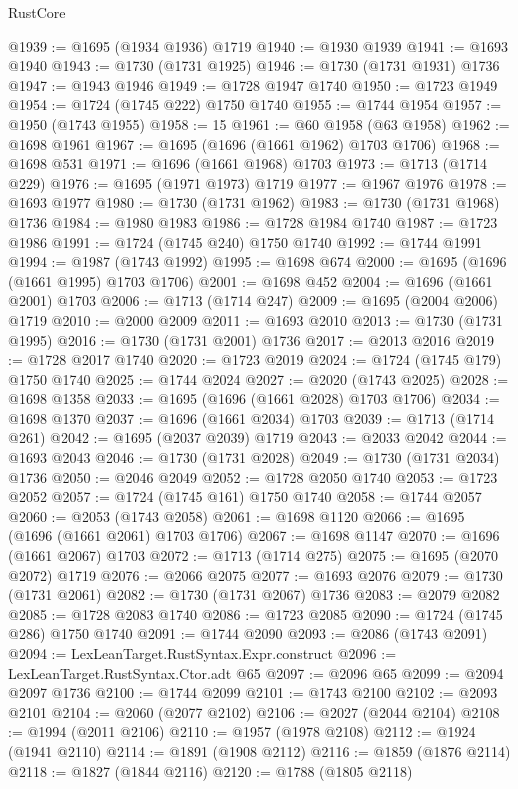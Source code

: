 \begin{lexlean}{RustCore}
\begin{coremodule}
@1939 := @1695 (@1934 @1936) @1719
@1940 := @1930 @1939
@1941 := @1693 @1940
@1943 := @1730 (@1731 @1925)
@1946 := @1730 (@1731 @1931) @1736
@1947 := @1943 @1946
@1949 := @1728 @1947 @1740
@1950 := @1723 @1949
@1954 := @1724 (@1745 @222) @1750 @1740
@1955 := @1744 @1954
@1957 := @1950 (@1743 @1955)
@1958 := 15
@1961 := @60 @1958 (@63 @1958)
@1962 := @1698 @1961
@1967 := @1695 (@1696 (@1661 @1962) @1703 @1706)
@1968 := @1698 @531
@1971 := @1696 (@1661 @1968) @1703
@1973 := @1713 (@1714 @229)
@1976 := @1695 (@1971 @1973) @1719
@1977 := @1967 @1976
@1978 := @1693 @1977
@1980 := @1730 (@1731 @1962)
@1983 := @1730 (@1731 @1968) @1736
@1984 := @1980 @1983
@1986 := @1728 @1984 @1740
@1987 := @1723 @1986
@1991 := @1724 (@1745 @240) @1750 @1740
@1992 := @1744 @1991
@1994 := @1987 (@1743 @1992)
@1995 := @1698 @674
@2000 := @1695 (@1696 (@1661 @1995) @1703 @1706)
@2001 := @1698 @452
@2004 := @1696 (@1661 @2001) @1703
@2006 := @1713 (@1714 @247)
@2009 := @1695 (@2004 @2006) @1719
@2010 := @2000 @2009
@2011 := @1693 @2010
@2013 := @1730 (@1731 @1995)
@2016 := @1730 (@1731 @2001) @1736
@2017 := @2013 @2016
@2019 := @1728 @2017 @1740
@2020 := @1723 @2019
@2024 := @1724 (@1745 @179) @1750 @1740
@2025 := @1744 @2024
@2027 := @2020 (@1743 @2025)
@2028 := @1698 @1358
@2033 := @1695 (@1696 (@1661 @2028) @1703 @1706)
@2034 := @1698 @1370
@2037 := @1696 (@1661 @2034) @1703
@2039 := @1713 (@1714 @261)
@2042 := @1695 (@2037 @2039) @1719
@2043 := @2033 @2042
@2044 := @1693 @2043
@2046 := @1730 (@1731 @2028)
@2049 := @1730 (@1731 @2034) @1736
@2050 := @2046 @2049
@2052 := @1728 @2050 @1740
@2053 := @1723 @2052
@2057 := @1724 (@1745 @161) @1750 @1740
@2058 := @1744 @2057
@2060 := @2053 (@1743 @2058)
@2061 := @1698 @1120
@2066 := @1695 (@1696 (@1661 @2061) @1703 @1706)
@2067 := @1698 @1147
@2070 := @1696 (@1661 @2067) @1703
@2072 := @1713 (@1714 @275)
@2075 := @1695 (@2070 @2072) @1719
@2076 := @2066 @2075
@2077 := @1693 @2076
@2079 := @1730 (@1731 @2061)
@2082 := @1730 (@1731 @2067) @1736
@2083 := @2079 @2082
@2085 := @1728 @2083 @1740
@2086 := @1723 @2085
@2090 := @1724 (@1745 @286) @1750 @1740
@2091 := @1744 @2090
@2093 := @2086 (@1743 @2091)
@2094 := LexLeanTarget.RustSyntax.Expr.construct
@2096 := LexLeanTarget.RustSyntax.Ctor.adt @65
@2097 := @2096 @65
@2099 := @2094 @2097 @1736
@2100 := @1744 @2099
@2101 := @1743 @2100
@2102 := @2093 @2101
@2104 := @2060 (@2077 @2102)
@2106 := @2027 (@2044 @2104)
@2108 := @1994 (@2011 @2106)
@2110 := @1957 (@1978 @2108)
@2112 := @1924 (@1941 @2110)
@2114 := @1891 (@1908 @2112)
@2116 := @1859 (@1876 @2114)
@2118 := @1827 (@1844 @2116)
@2120 := @1788 (@1805 @2118)

\end{coremodule}
\end{lexlean}

